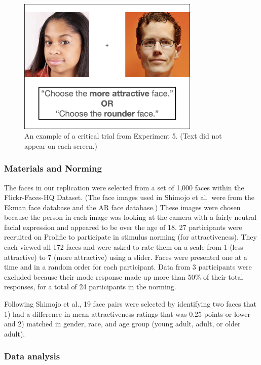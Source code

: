 \documentclass[
  man,floatsintext]{apa6}
\begin{document}
\begin{figure}
\includegraphics[width=3.41in]{group-e/E5-example-figure} \caption{An example of a critical trial from Experiment 5. (Text did not appear on each screen.)}\label{fig:E5-example-trial}
\end{figure}

\hypertarget{materials-and-norming}{%
\subsubsection{Materials and Norming}\label{materials-and-norming}}

The faces in our replication were selected from a set of 1,000 faces
within the Flickr-Faces-HQ Dataset. (The face images used in Shimojo et
al.~were from the Ekman face database and the AR face database.) These
images were chosen because the person in each image was looking at the
camera with a fairly neutral facial expression and appeared to be over
the age of 18. 27 participants were recruited on Prolific to participate
in stimulus norming (for attractiveness). They each viewed all 172 faces and were asked to rate
them on a scale from 1 (less attractive) to 7 (more attractive) using a
slider. Faces were presented one at a time and in a random order for
each participant. Data from 3 participants were excluded because
their mode response made up more than 50\% of their total responses, for a total of 24 participants
in the norming.

Following Shimojo et al., 19 face pairs were selected by
identifying two faces that 1) had a difference in mean attractiveness ratings
that was 0.25 points or lower and 2) matched in gender, race, and age
group (young adult, adult, or older adult).

\hypertarget{data-analysis}{%
\subsubsection{Data analysis}\label{data-analysis}}
\end{document}
